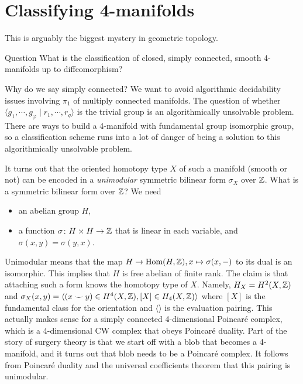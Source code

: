 \section{Classifying 4-manifolds} 
This is arguably the biggest mystery in geometric topology. 
\begin{namedthing}{Question} 
   What is the classification of closed, simply connected, smooth 4-manifolds up to diffeomorphism?
\end{namedthing}
Why do we say simply connected? We want to avoid algorithmic decidability issues involving $\pi_1$ of multiply connected manifolds. The question of whether $\langle g_1, \cdots ,g_{\varphi } \mid  r_1 ,\cdots , r_q\rangle $ is the trivial group is an algorithmically unsolvable problem. There are ways to build a 4-manifold with fundamental group isomorphic group, so a classification scheme runs into a lot of danger of being a solution to this algorithmically unsolvable problem.

It turns out that the oriented homotopy type $ X$ of such a manifold (smooth or not) can be encoded in a \emph{unimodular} symmetric bilinear form $\sigma_X$ over $\mathbb{Z}$. What is a symmetric bilinear form over $\mathbb{Z}$? We need
\begin{itemize}
\setlength\itemsep{-.2em}
    \item an abelian group $H$,
    \item a function $\sigma \colon H \times H \to \mathbb{Z}$ that is linear in each variable, and $\sigma(x,y) = \sigma(y, x)$.
\end{itemize}
Unimodular means that the map $H \to \operatorname{Hom}(H, \mathbb{Z}), x \mapsto  \sigma(x, -)$ to its dual is an isomorphic. This implies that $H$ is free abelian of finite rank. The claim is that attaching such a form knows the homotopy type of $X$. Namely, $H_X = H^2(X,\mathbb{Z})$ and $\sigma_X(x,y)= \langle (x\smile y) \in H^4(X, \mathbb{Z}), [X] \in H_4(X,\mathbb{Z}) \rangle $ where $[X]$ is the fundamental class for the orientation and $\langle  \rangle $ is the evaluation pairing. This actually makes sense for a simply connected 4-dimensional Poincar\'e complex, which is a 4-dimensional CW complex that obeys Poincar\'e duality.
Part of the story of surgery theory is that we start off with a blob that becomes a 4-manifold, and it turns out that blob needs to be a Poincar\'e complex. It follows from Poincar\'e duality and the universal coefficients theorem that this pairing is unimodular.

